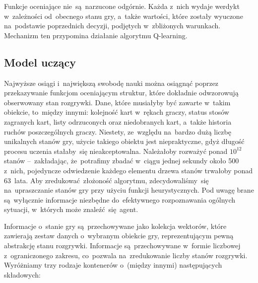 \documentclass[declaration,shortabstract,inz]{iithesis}
\begin{document}
Funkcje oceniające nie~są~narzucone odgórnie. Każda z~nich wydaje werdykt w~zależności od~obecnego stanu gry, a~także wartości, które zostały wyuczone na~podstawie poprzednich decyzji, podjętych w~zbliżonych warunkach. Mechanizm ten przypomina działanie algorytmu Q-learning\cite{Q-learning}.

\subsection*{Model uczący}

Najwyższe osiągi i~największą swobodę nauki można osiągnąć poprzez przekazywanie funkcjom oceniającym struktur, które dokładnie odwzorowują obserwowany stan rozgrywki. Dane, które musiałyby być zawarte w~takim obiekcie, to~między innymi: kolejność kart w~rękach graczy, status stosów zagranych kart, listy odrzuconych oraz niedobranych kart, a~także historia ruchów poszczególnych graczy. Niestety, ze~względu na~bardzo dużą liczbę unikalnych stanów gry, użycie takiego obiektu jest niepraktyczne, gdyż długość procesu uczenia stałaby~się nieakceptowalna. Należałoby rozważyć ponad $10^{12}$ stanów --~zakładając, że~potrafimy zbadać w~ciągu jednej sekundy około 500 z~nich, pojedyncze odwiedzenie każdego elementu drzewa stanów trwałoby ponad 63~lata. Aby zredukować złożoność algorytmu, zdecydowaliśmy~się na~upraszczanie stanów gry przy użyciu funkcji heurystycznych. Pod uwagę brane są~wyłącznie informacje niezbędne do~efektywnego rozpoznawania ogólnych sytuacji, w~których może znaleźć~się agent.

Informacje o~stanie gry są~przechowywane jako kolekcja wektorów, które zawierają zestaw danych o~wybranym obiekcie gry, reprezentującym pewną abstrakcję stanu rozgrywki. Informacje są~przechowywane w~formie liczbowej z~ograniczonego zakresu, co~pozwala na~zredukowanie liczby stanów rozgrywki. Wyróżniamy trzy rodzaje kontenerów o~(między innymi) następujących składowych:
\end{document}
